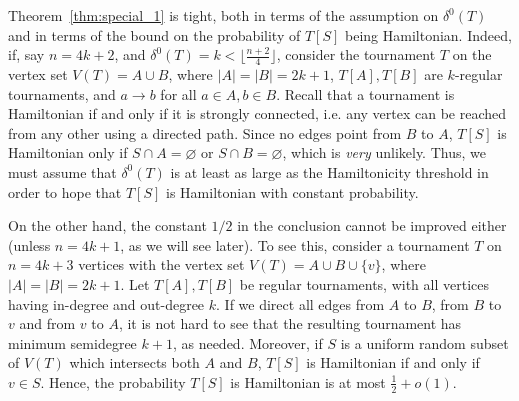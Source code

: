 \documentclass[a4paper,11pt]{article}
\theoremstyle{definition}
\begin{document}
Theorem~\ref{thm:special_1} is tight, both in terms of the assumption on $\delta^0(T)$ and in terms of the bound on the probability of $T[S]$ being Hamiltonian. Indeed, if, say $n=4k+2$, and $\delta^0(T)=k< \lfloor \frac{n+2}{4}\rfloor$, consider the tournament $T$ on the vertex set $V(T)=A\cup B$, where $|A|=|B|=2k+1$, $T[A], T[B]$ are $k$-regular tournaments, and $a\to b$ for all $a\in A, b\in B$. Recall that a tournament is Hamiltonian if and only if it is strongly connected, i.e. any vertex can be reached from any other using a directed path. Since no edges point from $B$ to $A$, $T[S]$ is Hamiltonian only if $S\cap A=\varnothing$ or $S\cap B=\varnothing$, which is \textit{very} unlikely. Thus, we must assume that $\delta^0(T)$ is at least as large as the Hamiltonicity threshold in order to hope that $T[S]$ is Hamiltonian with constant probability.

On the other hand, the constant $1/2$ in the conclusion cannot be improved either (unless $n=4k+1$, as we will see later). To see this, consider a tournament $T$ on $n=4k+3$ vertices with the vertex set $V(T)=A\cup B\cup \{v\}$, where $|A|=|B|=2k+1$. Let $T[A], T[B]$ be regular tournaments, with all vertices having in-degree and out-degree $k$. If we direct all edges from $A$ to $B$, from $B$ to $v$ and from $v$ to $A$, it is not hard to see that the resulting tournament has minimum semidegree $k+1$, as needed. Moreover, if $S$ is a uniform random subset of $V(T)$ which intersects both $A$ and $B$, $T[S]$ is Hamiltonian if and only if $v\in S$. Hence, the probability $T[S]$ is Hamiltonian is at most $\frac{1}{2}+o(1)$. 
\end{document}

